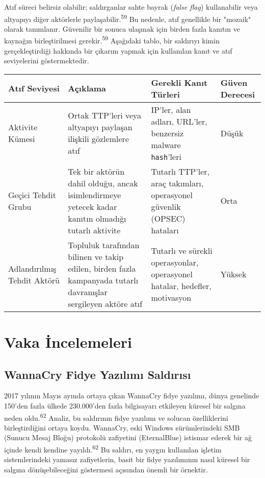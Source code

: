 Atıf süreci belirsiz olabilir; saldırganlar sahte bayrak (\textit{false flag}) kullanabilir veya altyapıyı diğer aktörlerle paylaşabilir.\textsuperscript{59} Bu nedenle, atıf genellikle bir "mozaik" olarak tanımlanır. Güvenilir bir sonuca ulaşmak için birden fazla kanıtın ve kaynağın birleştirilmesi gerekir.\textsuperscript{59}
Aşağıdaki tablo, bir saldırıyı kimin gerçekleştirdiği hakkında bir çıkarım yapmak için kullanılan kanıt ve atıf seviyelerini göstermektedir.

\begin{longtable}{|l|p{4cm}|p{4cm}|p{2cm}|}
\hline
\textbf{Atıf Seviyesi} & \textbf{Açıklama} & \textbf{Gerekli Kanıt Türleri} & \textbf{Güven Derecesi} \\
\hline
Aktivite Kümesi & Ortak TTP'leri veya altyapıyı paylaşan ilişkili gözlemlere atıf & IP'ler, alan adları, URL'ler, benzersiz malware \texttt{hash}'leri & Düşük \\
\hline
Geçici Tehdit Grubu & Tek bir aktörün dahil olduğu, ancak isimlendirmeye yetecek kadar kanıtın olmadığı tutarlı aktivite & Tutarlı TTP'ler, araç takımları, operasyonel güvenlik (OPSEC) hataları & Orta \\
\hline
Adlandırılmış Tehdit Aktörü & Topluluk tarafından bilinen ve takip edilen, birden fazla kampanyada tutarlı davranışlar sergileyen aktöre atıf & Tutarlı ve sürekli operasyonlar, operasyonel hatalar, hedefler, motivasyon & Yüksek \\
\hline
\end{longtable}

\section{Vaka İncelemeleri}

\subsection{WannaCry Fidye Yazılımı Saldırısı}

2017 yılının Mayıs ayında ortaya çıkan WannaCry fidye yazılımı, dünya genelinde 150'den fazla ülkede 230.000'den fazla bilgisayarı etkileyen küresel bir salgına neden oldu.\textsuperscript{62} Analiz, bu saldırının fidye yazılımı ve solucan özelliklerini birleştirdiğini ortaya koydu. WannaCry, eski Windows sürümlerindeki SMB (Sunucu Mesaj Bloğu) protokolü zafiyetini (EternalBlue) istismar ederek bir ağ içinde kendi kendine yayıldı.\textsuperscript{62} Bu saldırı, en yaygın kullanılan işletim sistemlerindeki yamasız zafiyetlerin, basit bir fidye yazılımının nasıl küresel bir salgına dönüşebileceğini göstermesi açısından önemli bir örnektir.

